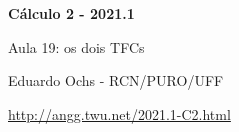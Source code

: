 \documentclass[oneside,12pt]{article}
\begin{document}


%
%

\def\Rd{\ColorRed}
\def\pfo#1{\ensuremath{\mathsf{[#1]}}}

\def\drafturl{http://angg.twu.net/LATEX/2021-1-C2.pdf}
\def\drafturl{http://angg.twu.net/2021.1-C2.html}
\def\draftfooter{\tiny \href{\drafturl}{\jobname{}} \ColorBrown{\shorttoday{} \hours}}



%

\thispagestyle{empty}

\begin{center}

\vspace*{1.2cm}

{\bf \Large Cálculo 2 - 2021.1}

\bsk

Aula 19: os dois TFCs

\bsk

Eduardo Ochs - RCN/PURO/UFF

\url{http://angg.twu.net/2021.1-C2.html}

\end{center}
\end{document}
